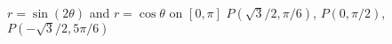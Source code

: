 {$r=\sin(2\theta)$ and $r=\cos\theta$ on $[0,\pi]$}
{$P(\sqrt{3}/2,\pi/6)$, $P(0,\pi/2)$, $P(-\sqrt{3}/2,5\pi/6)$
}
